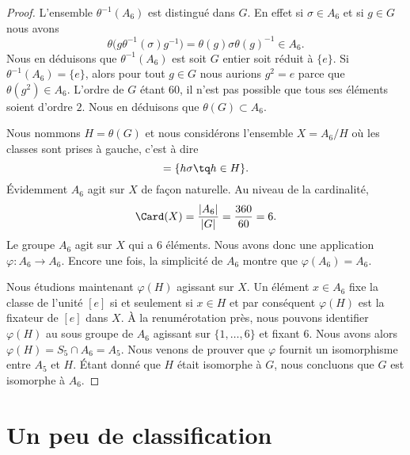 \begin{proof}
    L'ensemble \( \theta^{-1}(A_6)\) est distingué dans \( G\). En effet si \( \sigma\in A_6\) et si \( g\in G\) nous avons
    \begin{equation}
        \theta\big( g\theta^{-1}(\sigma)g^{-1} \big)=\theta(g)\sigma \theta(g)^{-1}\in A_6.
    \end{equation}
    Nous en déduisons que \( \theta^{-1}(A_6)\) est soit \( G\) entier soit réduit à \( \{ e \}\). Si \( \theta^{-1}(A_6)=\{ e \}\), alors pour tout \( g\in G\) nous aurions \( g^2=e\) parce que \( \theta(g^2)\in A_6\). L'ordre de \( G\) étant \( 60\), il n'est pas possible que tous ses éléments soient d'ordre \( 2\). Nous en déduisons que \( \theta(G)\subset A_6\).

    Nous nommons \( H=\theta(G)\) et nous considérons l'ensemble \( X=A_6/H\) où les classes sont prises à gauche, c'est à dire 
    \begin{equation}
        [\sigma]=\{ h\sigma\tq h\in H \}.
    \end{equation}
    Évidemment \( A_6\) agit sur \( X\) de façon naturelle. Au niveau de la cardinalité,
    \begin{equation}
        \Card(X)=\frac{ | A_6 | }{ | G | }=\frac{ 360 }{ 60 }=6.
    \end{equation}
    Le groupe \( A_6\) agit sur \( X\) qui a \( 6\) éléments. Nous avons donc une application \( \varphi\colon A_6\to A_6\). Encore une fois, la simplicité de \( A_6\) montre que \( \varphi(A_6)=A_6\).

    Nous étudions maintenant \( \varphi(H)\) agissant sur \( X\). Un élément \( x\in A_6\) fixe la classe de l'unité \( [e]\) si et seulement si \( x\in H\) et par conséquent \( \varphi(H)\) est la fixateur de \( [e]\) dans \( X\). À la renumérotation près, nous pouvons identifier \( \varphi(H)\) au sous groupe de \( A_6\) agissant sur \( \{ 1,\ldots, 6 \}\) et fixant \( 6\). Nous avons alors \( \varphi(H)=S_5\cap A_6=A_5\). Nous venons de prouver que \( \varphi\) fournit un isomorphisme entre \( A_5\) et \( H\). Étant donné que \( H\) était isomorphe à \( G\), nous concluons que \( G\) est isomorphe à \( A_6\).
\end{proof}

\section{Un peu de classification}

